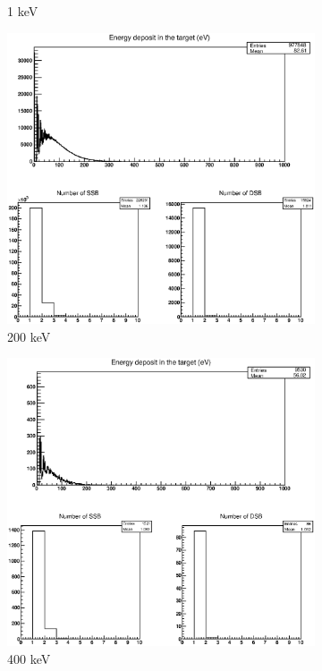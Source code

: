 \begin{figure}
\begin{subfigure}{.5\textwidth}
  \caption{1 keV}
  \label{fig:subi5}
\end{subfigure}%
\begin{subfigure}{.5\textwidth}
  \centering
  \includegraphics[width=.78\linewidth]{./Figures/1fzxp200kev.eps}
  \caption{200 keV}
  \label{fig:subi6}
\end{subfigure}
\begin{subfigure}{.5\textwidth}
  \centering
  \includegraphics[width=.78\linewidth]{./Figures/1fzxp400kev.eps}
  \caption{400 keV}
  \label{fig:subi7}
\end{subfigure}%
\begin{subfigure}{.5\textwidth}
  \centering

\end{subfigure}
\end{figure}
